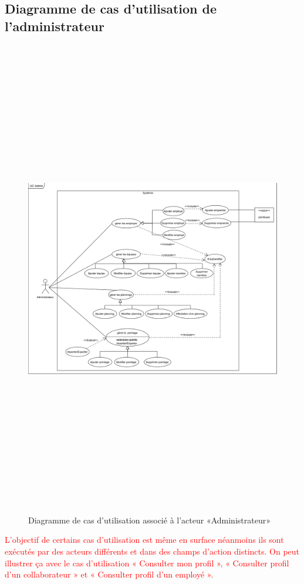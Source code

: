 \subsection{Diagramme de cas d'utilisation de l'administrateur}
    \begin{figure}[h!]
         \centering
         \includegraphics[angle=90, height=21cm]{images/uc_admin.png}
         \caption{Diagramme de cas d'utilisation associé à l'acteur «Administrateur»}
         \label{fig5}
    \end{figure}

\clearpage
\textcolor{red}{
L’objectif de certains cas d’utilisation est même en surface néanmoins ils sont
exécutés par des acteurs différents et dans des champs d’action distincts. On
peut illustrer ça avec le cas d’utilisation « Consulter mon profil », «
Consulter profil d’un collaborateur » et « Consulter profil d’un employé ». 
}

